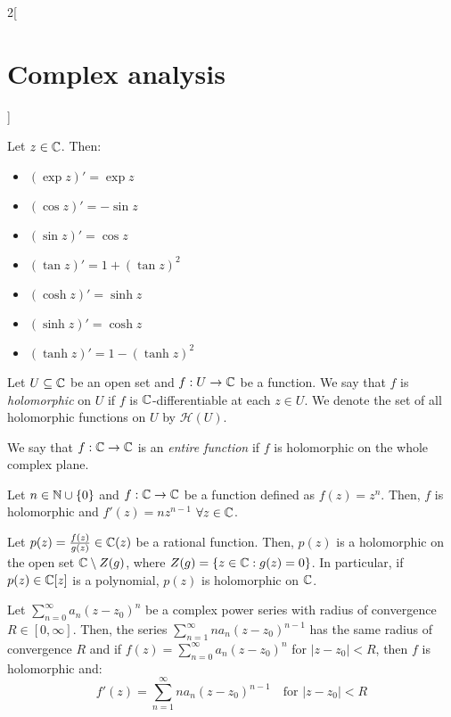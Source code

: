 \documentclass[../../../main_math.tex]{subfiles}
\begin{document}
\begin{multicols}{2}[\section{Complex analysis}]
\begin{theorem}
  \end{theorem}
  \begin{proposition}
    Let $z\in\mathbb{C}$. Then:
    \begin{itemize}
      \item ${\left(\exp{z}\right)}'=\exp{z}$
      \item ${\left(\cos{z}\right)}'=-\sin{z}$
      \item ${\left(\sin{z}\right)}'=\cos{z}$
      \item ${\left(\tan{z}\right)}'=1+{(\tan{z})}^2$
      \item ${\left(\cosh{z}\right)}'=\sinh{z}$
      \item ${\left(\sinh{z}\right)}'=\cosh{z}$
      \item ${\left(\tanh{z}\right)}'=1-{(\tanh{z})}^2$
    \end{itemize}
  \end{proposition}
  \begin{definition}
    Let $U\subseteq \mathbb{C}$ be an open set and $f:U\rightarrow \mathbb{C}$ be a function. We say that $f$ is \emph{holomorphic} on $U$ if $f$ is $\mathbb{C}$-differentiable at each $z\in U$. We denote the set of all holomorphic functions on $U$ by $\mathcal{H}(U)$.
  \end{definition}
  \begin{definition}
    We say that $f:\mathbb{C}\rightarrow\mathbb{C}$ is an \emph{entire function} if $f$ is holomorphic on the whole complex plane.
  \end{definition}
  \begin{proposition}
    Let $n\in\mathbb{N}\cup\{0\}$ and $f:\mathbb{C}\rightarrow\mathbb{C}$ be a function defined as  $f(z)=z^n$. Then, $f$ is holomorphic and $f'(z)=nz^{n-1}$ $\forall z\in\mathbb{C}$.
  \end{proposition}
  \begin{corollary}
    Let $p(z)=\frac{f(z)}{g(z)}\in\mathbb{C}(z)$ be a rational function. Then, $p(z)$ is a holomorphic on the open set $\mathbb{C}\setminus Z(g)$, where $Z(g)=\{z\in\mathbb{C}:g(z)=0\}$.
    In particular, if $p(z)\in\mathbb{C}[z]$ is a polynomial, $p(z)$ is holomorphic on $\mathbb{C}$.
  \end{corollary}
  \begin{theorem}
    Let $\sum_{n=0}^\infty a_n{(z-z_0)}^n$ be a complex power series with radius of convergence $R\in[0,\infty]$. Then, the series $\sum_{n=1}^\infty na_n{(z-z_0)}^{n-1}$ has the same radius of convergence $R$ and if $f(z)=\sum_{n=0}^\infty a_n{(z-z_0)}^n$ for $|z-z_0|<R$, then $f$ is holomorphic and: $$f'(z)=\sum_{n=1}^\infty na_n{(z-z_0)}^{n-1}\quad\text{for } |z-z_0|<R$$

\end{theorem}
\end{multicols}
\end{document}
